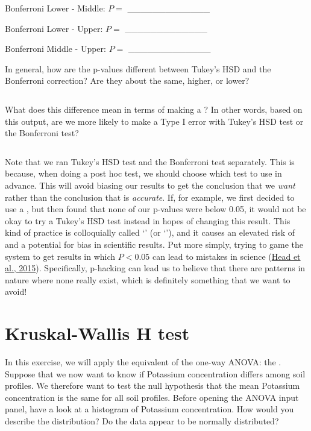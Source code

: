 \documentclass[
  openany]{krantz}
\begin{document}
Bonferroni Lower - Middle: \(P =\) \_\_\_\_\_\_\_\_\_\_\_\_\_

Bonferroni Lower - Upper: \(P =\) \_\_\_\_\_\_\_\_\_\_\_\_\_

Bonferroni Middle - Upper: \(P =\) \_\_\_\_\_\_\_\_\_\_\_\_\_

In general, how are the p-values different between Tukey's HSD and the Bonferroni correction?
Are they about the same, higher, or lower?

\begin{verbatim}
\end{verbatim}

What does this difference mean in terms of making a ?
In other words, based on this output, are we more likely to make a Type I error with Tukey's HSD test or the Bonferroni test?

\begin{verbatim}

\end{verbatim}

Note that we ran Tukey's HSD test and the Bonferroni test separately.
This is because, when doing a post hoc test, we should choose which test to use in advance.
This will avoid biasing our results to get the conclusion that we \emph{want} rather than the conclusion that is \emph{accurate}.
If, for example, we first decided to use a , but then found that none of our p-values were below 0.05, it would not be okay to try a Tukey's HSD test instead in hopes of changing this result.
This kind of practice is colloquially called `' (or `'), and it causes an elevated risk of  and a potential for bias in scientific results.
Put more simply, trying to game the system to get results in which \(P < 0.05\) can lead to mistakes in science (\protect\hyperlink{ref-Head2015}{Head et al., 2015}).
Specifically, p-hacking can lead us to believe that there are patterns in nature where none really exist, which is definitely something that we want to avoid!

\hypertarget{kruskal-wallis-h-test}{%
\section{Kruskal-Wallis H test}\label{kruskal-wallis-h-test}}

In this exercise, we will apply the  equivalent of the one-way ANOVA: the .
Suppose that we now want to know if Potassium concentration differs among soil profiles.
We therefore want to test the null hypothesis that the mean Potassium concentration is the same for all soil profiles.
Before opening the ANOVA input panel, have a look at a histogram of Potassium concentration.
How would you describe the distribution?
Do the data appear to be normally distributed?
\end{document}
